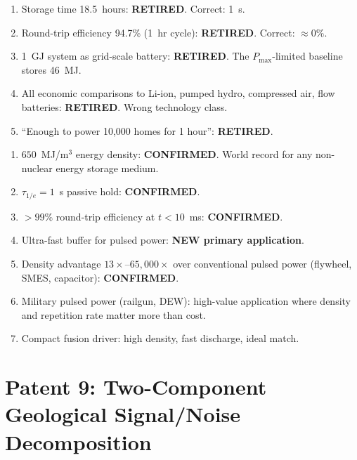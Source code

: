 \documentclass[11pt]{article}
\theoremstyle{definition}
\theoremstyle{remark}
\newcommand{\Pmax}{P_{\mathrm{max}}}
\begin{document}
\begin{tcolorbox}[colback=red!5!white, colframe=red!60!black,
  title=\textbf{Values Permanently Retired by Storage Time Correction}]
\begin{enumerate}[nosep]
\item Storage time 18.5~hours: \textbf{RETIRED}. Correct: 1~s.
\item Round-trip efficiency 94.7\% (1~hr cycle): \textbf{RETIRED}.
  Correct: $\approx 0\%$.
\item 1~GJ system as grid-scale battery: \textbf{RETIRED}. The
  $\Pmax$-limited baseline stores 46~MJ.
\item All economic comparisons to Li-ion, pumped hydro, compressed air,
  flow batteries: \textbf{RETIRED}. Wrong technology class.
\item ``Enough to power 10,000 homes for 1 hour'': \textbf{RETIRED}.
\end{enumerate}
\end{tcolorbox}

\begin{tcolorbox}[colback=green!5!white, colframe=green!40!black,
  title=\textbf{Corrected P7 Value Proposition}]
\begin{enumerate}[nosep]
\item $650$~MJ/m$^3$ energy density: \textbf{CONFIRMED}. World record
  for any non-nuclear energy storage medium.
\item $\tau_{1/e} = 1$~s passive hold: \textbf{CONFIRMED}.
\item $> 99\%$ round-trip efficiency at $t < 10$~ms: \textbf{CONFIRMED}.
\item Ultra-fast buffer for pulsed power: \textbf{NEW primary application}.
\item Density advantage $13\times$--$65{,}000\times$ over conventional
  pulsed power (flywheel, SMES, capacitor): \textbf{CONFIRMED}.
\item Military pulsed power (railgun, DEW): high-value application
  where density and repetition rate matter more than cost.
\item Compact fusion driver: high density, fast discharge, ideal match.
\end{enumerate}
\end{tcolorbox}

\part{Patent 9: Two-Component Geological Signal/Noise Decomposition}
\label{part:P9}
\end{document}
